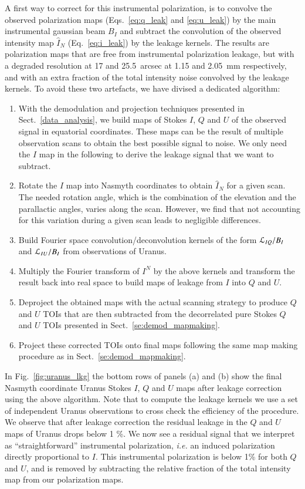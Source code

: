 \documentclass[twocolumn, traditabstract]{aa}
\begin{document}
A first way to correct for this instrumental polarization, is to convolve the
observed polarization maps (Eqs.~\ref{eq:q_leak} and \ref{eq:u_leak}) by the main instrumental gaussian beam
$B_I$ and subtract the convolution of the observed intensity map $\hat{I}_N$
(Eq.~\ref{eq:i_leak}) by the leakage kernels. The results are polarization maps
that are free from instrumental polarization leakage, but with a degraded resolution at
17 and 25.5~arcsec at 1.15 and 2.05~mm respectively, and with an extra fraction
of the total intensity noise convolved by the leakage kernels. To avoid these
two artefacts, we have divised a dedicated algorithm:
 \begin{enumerate}
 \item With the demodulation and projection techniques presented in
   Sect.~\ref{data_analysis}, we build maps of Stokes $I$, $Q$ and $U$ of the
   observed signal in equatorial coordinates. These maps can be the result of
   multiple observation scans to obtain the best possible signal to
   noise. We only need the $I$ map in the following to derive the leakage signal that we want to subtract.
 \item Rotate the $I$ map into Nasmyth coordinates to obtain $\hat{I}_N$ for
   a given scan. The needed rotation angle, which is the combination of the
   elevation and the parallactic angles, varies along the scan. However, we find
   that not accounting for this variation during a given scan leads to negligible differences.
 \item Build Fourier space convolution/deconvolution kernels of the form
   ${\cal{L}}_{IQ}/B_I$ and ${\cal{L}}_{IU}/B_I$ from observations of
   Uranus.
 \item Multiply the Fourier transform of $I^N$ by the above kernels 
   and transform the result back into real space to build maps of leakage from $I$ into $Q$ and $U$.
 \item Deproject the obtained maps with the actual scanning strategy to produce $Q$ and $U$ TOIs that
  are then subtracted from the decorrelated pure Stokes $Q$ and $U$ TOIs presented in Sect.~\ref{se:demod_mapmaking}.
 \item Project these corrected TOIs onto final maps following the same map making
   procedure as in Sect.~\ref{se:demod_mapmaking}.
 \end{enumerate}
 
 In Fig.~\ref{fig:uranus_lkg} the bottom rows of panels (a) and (b) show the
 final Nasmyth coordinate Uranus Stokes $I$, $Q$ and $U$ maps after leakage
 correction using the above algorithm. Note that to compute the leakage kernels
 we use a set of independent Uranus observations to cross check the efficiency of
 the procedure.  We observe that after leakage correction the residual leakage in
 the $Q$ and $U$ maps of Uranus drops below 1 \%. We now see a residual
 signal that we interpret as ``straightforward'' instrumental polarization,
 {\it i.e.} an induced polarization directly proportional to $I$. This instrumental
 polarization is below 1\% for both $Q$ and $U$, and is removed
 by subtracting the relative fraction of the total intensity map from
 our polarization maps.
\end{document}
